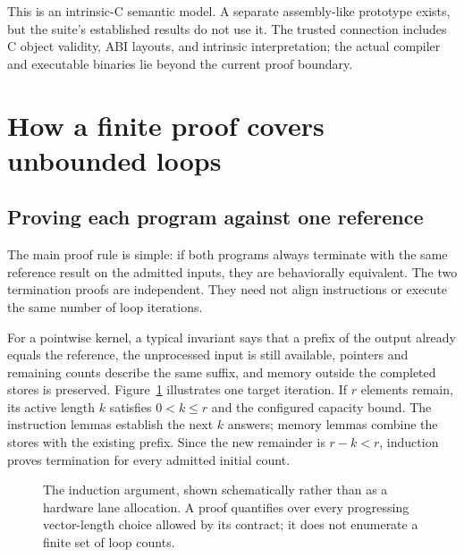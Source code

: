 \documentclass[11pt]{article}
\begin{document}
This is an intrinsic-C semantic model. A separate assembly-like prototype exists, but the suite's established results do not use it. The trusted connection includes C object validity, ABI layouts, and intrinsic interpretation; the actual compiler and executable binaries lie beyond the current proof boundary.

\section{How a finite proof covers unbounded loops}
\subsection{Proving each program against one reference}
The main proof rule is simple: if both programs always terminate with the same reference result on the admitted inputs, they are behaviorally equivalent. The two termination proofs are independent. They need not align instructions or execute the same number of loop iterations.

For a pointwise kernel, a typical invariant says that a prefix of the output already equals the reference, the unprocessed input is still available, pointers and remaining counts describe the same suffix, and memory outside the completed stores is preserved. Figure~\ref{fig:induction} illustrates one target iteration. If $r$ elements remain, its active length $k$ satisfies $0<k\le r$ and the configured capacity bound. The instruction lemmas establish the next $k$ answers; memory lemmas combine the stores with the existing prefix. Since the new remainder is $r-k<r$, induction proves termination for every admitted initial count.

\begin{figure}[htbp]
\centering
{}
\caption{The induction argument, shown schematically rather than as a hardware lane allocation. A proof quantifies over every progressing vector-length choice allowed by its contract; it does not enumerate a finite set of loop counts.}
\label{fig:induction}
\end{figure}
\end{document}
